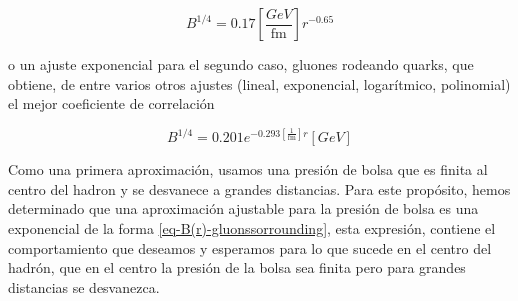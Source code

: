 \begin{equation}\label{eq-B(r)-seagluons}
{B}^{1/4} = 0.17 \left[\frac{\unit{GeV}}{\unit{\femto\meter}}\right] {r}^{-0.65}
\end{equation}

o un ajuste exponencial para el \allowbreak segundo caso, gluones rodeando quarks, que obtiene, de entre \allowbreak varios otros ajustes (lineal, exponencial, \allowbreak logarítmico, polinomial) el mejor \allowbreak coeficiente de correlación

\begin{equation}\label{eq-B(r)-gluonssorrounding}
{B}^{1/4} = 0.201  {e}^{-0.293\left[\frac{1}{\unit{\femto\meter}}\right]r} \left[{\unit{GeV}}\right]
\end{equation}

Como una primera aproximación, usamos una presión de bolsa que es finita al centro del hadron y se desvanece a grandes distancias. Para este propósito, hemos determinado que una aproximación ajustable para la presión de bolsa es una exponencial de la forma \eqref{eq-B(r)-gluonssorrounding}, esta expresión, contiene el comportamiento que deseamos y esperamos para lo que sucede en el centro del hadrón, que en el centro la presión de la bolsa sea finita pero para grandes distancias se desvanezca.